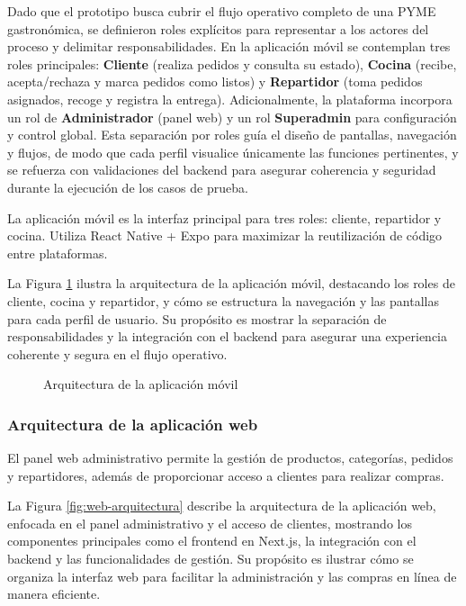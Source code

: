   Dado que el prototipo busca cubrir el flujo operativo completo de una PYME gastronómica, se definieron roles explícitos para representar a los actores del proceso y delimitar responsabilidades. En la aplicación móvil se contemplan tres roles principales: \textbf{Cliente} (realiza pedidos y consulta su estado), \textbf{Cocina} (recibe, acepta/rechaza y marca pedidos como listos) y \textbf{Repartidor} (toma pedidos asignados, recoge y registra la entrega). Adicionalmente, la plataforma incorpora un rol de \textbf{Administrador} (panel web) y un rol \textbf{Superadmin} para configuración y control global. Esta separación por roles guía el diseño de pantallas, navegación y flujos, de modo que cada perfil visualice únicamente las funciones pertinentes, y se refuerza con validaciones del backend para asegurar coherencia y seguridad durante la ejecución de los casos de prueba.

  La aplicación móvil es la interfaz principal para tres roles: cliente, repartidor y cocina. Utiliza React Native + Expo para maximizar la reutilización de código entre plataformas.

  La Figura \ref{fig:movil-arquitectura} ilustra la arquitectura de la aplicación móvil, destacando los roles de cliente, cocina y repartidor, y cómo se estructura la navegación y las pantallas para cada perfil de usuario. Su propósito es mostrar la separación de responsabilidades y la integración con el backend para asegurar una experiencia coherente y segura en el flujo operativo.

  \begin{figure}[htbp]
  \centering
  \resizebox{0.55\textwidth}{!}{}
  \caption[Arquitectura móvil]{Arquitectura de la aplicación móvil}
  \label{fig:movil-arquitectura}
  \end{figure}

  \subsubsection{Arquitectura de la aplicación web}

  El panel web administrativo permite la gestión de productos, categorías, pedidos y repartidores, además de proporcionar acceso a clientes para realizar compras.

  La Figura \ref{fig:web-arquitectura} describe la arquitectura de la aplicación web, enfocada en el panel administrativo y el acceso de clientes, mostrando los componentes principales como el frontend en Next.js, la integración con el backend y las funcionalidades de gestión. Su propósito es ilustrar cómo se organiza la interfaz web para facilitar la administración y las compras en línea de manera eficiente.

